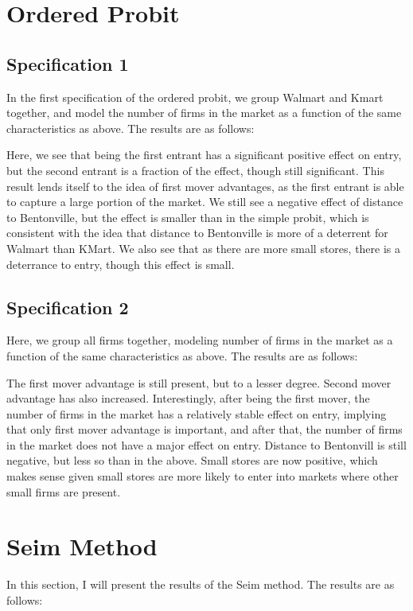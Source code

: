 \documentclass[11pt]{article}
\theoremstyle{definition}
\theoremstyle{remark}
\begin{document}
\section{Ordered Probit}

\subsection{Specification 1}
In the first specification of the ordered probit, we group Walmart and Kmart together, and model the number of firms in the market as a function of the same characteristics as above. The results are as follows:



Here, we see that being the first entrant has a significant positive effect on entry, but the second entrant is a fraction of the effect, though still significant. This result lends itself to the idea of first mover advantages, as the first entrant is able to capture a large portion of the market. We still see a negative effect of distance to Bentonville, but the effect is smaller than in the simple probit, which is consistent with the idea that distance to Bentonville is more of a deterrent for Walmart than KMart. We also see that as there are more small stores, there is a deterrance to entry, though this effect is small.

\subsection{Specification 2}
Here, we group all firms together, modeling number of firms in the market as a function of the same characteristics as above. The results are as follows:



The first mover advantage is still present, but to a lesser degree. Second mover advantage has also increased. Interestingly, after being the first mover, the number of firms in the market has a relatively stable effect on entry, implying that only first mover advantage is important, and after that, the number of firms in the market does not have a major effect on entry. Distance to Bentonvill is still negative, but less so than in the above. Small stores are now positive, which makes sense given small stores are more likely to enter into markets where other small firms are present. 

\section{Seim Method}
In this section, I will present the results of the Seim method. The results are as follows:
\end{document}

